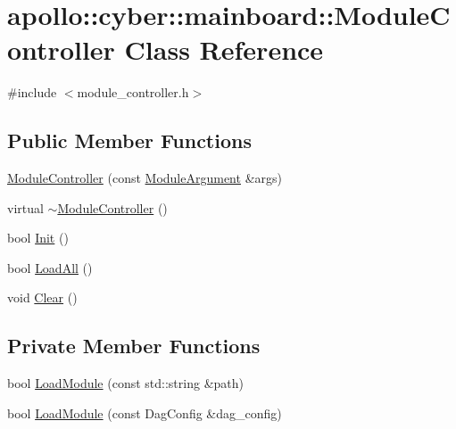 \hypertarget{classapollo_1_1cyber_1_1mainboard_1_1ModuleController}{\section{apollo\-:\-:cyber\-:\-:mainboard\-:\-:Module\-Controller Class Reference}
\label{classapollo_1_1cyber_1_1mainboard_1_1ModuleController}
}


{\ttfamily \#include $<$module\-\_\-controller.\-h$>$}

\subsection*{Public Member Functions}
\begin{DoxyCompactItemize}
\item 
\hyperlink{classapollo_1_1cyber_1_1mainboard_1_1ModuleController_a047e17499f1b777f6f6be791a40a1c76}{Module\-Controller} (const \hyperlink{classapollo_1_1cyber_1_1mainboard_1_1ModuleArgument}{Module\-Argument} \&args)
\item 
virtual \hyperlink{classapollo_1_1cyber_1_1mainboard_1_1ModuleController_afbd407169fe01900bdf58dc592bd38b6}{$\sim$\-Module\-Controller} ()
\item 
bool \hyperlink{classapollo_1_1cyber_1_1mainboard_1_1ModuleController_a38579b5ff6e9d9272324da7a2c5681a5}{Init} ()
\item 
bool \hyperlink{classapollo_1_1cyber_1_1mainboard_1_1ModuleController_ae8d327a0219a894f21645962d2e070fb}{Load\-All} ()
\item 
void \hyperlink{classapollo_1_1cyber_1_1mainboard_1_1ModuleController_ab2378b5653c8b5b17498c7a9f7ce15f8}{Clear} ()
\end{DoxyCompactItemize}
\subsection*{Private Member Functions}
\begin{DoxyCompactItemize}
\item 
bool \hyperlink{classapollo_1_1cyber_1_1mainboard_1_1ModuleController_aafd53f7c626097358365b5db265cd4fa}{Load\-Module} (const std\-::string \&path)
\item 
bool \hyperlink{classapollo_1_1cyber_1_1mainboard_1_1ModuleController_a344552c7d638106832348922b136fc4f}{Load\-Module} (const Dag\-Config \&dag\-\_\-config)
\end{DoxyCompactItemize}
